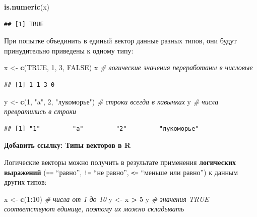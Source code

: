 \documentclass[
]{book}
\newenvironment{Shaded}{\begin{snugshade}}{\end{snugshade}}
\newcommand{\CommentTok}[1]{\textcolor[rgb]{0.56,0.35,0.01}{\textit{#1}}}
\newcommand{\ConstantTok}[1]{\textcolor[rgb]{0.56,0.35,0.01}{#1}}
\newcommand{\DecValTok}[1]{\textcolor[rgb]{0.00,0.00,0.81}{#1}}
\newcommand{\FunctionTok}[1]{\textcolor[rgb]{0.13,0.29,0.53}{\textbf{#1}}}
\newcommand{\NormalTok}[1]{#1}
\newcommand{\OtherTok}[1]{\textcolor[rgb]{0.56,0.35,0.01}{#1}}
\newcommand{\SpecialCharTok}[1]{\textcolor[rgb]{0.81,0.36,0.00}{\textbf{#1}}}
\newcommand{\StringTok}[1]{\textcolor[rgb]{0.31,0.60,0.02}{#1}}
\theoremstyle{definition}
\theoremstyle{definition}
\theoremstyle{definition}
\theoremstyle{definition}
\theoremstyle{remark}
\begin{document}
\begin{Shaded}
\begin{Highlighting}[]
\FunctionTok{is.numeric}\NormalTok{(x)}
\end{Highlighting}
\end{Shaded}

\begin{verbatim}
## [1] TRUE
\end{verbatim}

При попытке объединить в единый вектор данные разных типов, они будут принудительно приведены к одному типу:

\begin{Shaded}
\begin{Highlighting}[]
\NormalTok{x }\OtherTok{\textless{}{-}} \FunctionTok{c}\NormalTok{(}\ConstantTok{TRUE}\NormalTok{, }\DecValTok{1}\NormalTok{, }\DecValTok{3}\NormalTok{, }\ConstantTok{FALSE}\NormalTok{)}
\NormalTok{x }\CommentTok{\# логические значения переработаны в числовые}
\end{Highlighting}
\end{Shaded}

\begin{verbatim}
## [1] 1 1 3 0
\end{verbatim}

\begin{Shaded}
\begin{Highlighting}[]
\NormalTok{y }\OtherTok{\textless{}{-}} \FunctionTok{c}\NormalTok{(}\DecValTok{1}\NormalTok{, }\StringTok{"a"}\NormalTok{, }\DecValTok{2}\NormalTok{, }\StringTok{"лукоморье"}\NormalTok{) }\CommentTok{\# строки всегда в кавычках}
\NormalTok{y }\CommentTok{\# числа превратились в строки}
\end{Highlighting}
\end{Shaded}

\begin{verbatim}
## [1] "1"         "a"         "2"         "лукоморье"
\end{verbatim}

\textbf{Добавить ссылку: Типы векторов в R}

Логические векторы можно получить в результате применения \textbf{логических выражений} (\texttt{==} ``равно'', \texttt{!=} ``не равно'', \texttt{\textless{}=} ``меньше или равно'') к данным других типов:

\begin{Shaded}
\begin{Highlighting}[]
\NormalTok{x }\OtherTok{\textless{}{-}} \FunctionTok{c}\NormalTok{(}\DecValTok{1}\SpecialCharTok{:}\DecValTok{10}\NormalTok{) }\CommentTok{\# числа от 1 до 10}
\NormalTok{y }\OtherTok{\textless{}{-}}\NormalTok{ x }\SpecialCharTok{\textgreater{}} \DecValTok{5}
\NormalTok{y }\CommentTok{\# значения TRUE соответствуют единице, поэтому их можно складывать}
\end{Highlighting}
\end{Shaded}
\end{document}
